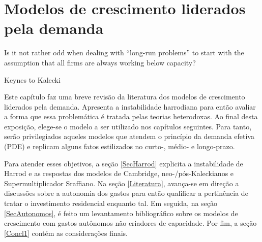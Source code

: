 \chapter{Modelos de crescimento liderados pela demanda}
\label{CapTeorico}

\epigraph{Is it not rather odd when dealing with ``long-run problems'' to start with the assumption that all firms are always working below capacity?}{Keynes to Kalecki}


Este capítulo faz uma breve revisão da literatura dos modelos de crescimento liderados pela demanda. Apresenta a instabilidade harrodiana para então avaliar a forma que essa problemática é tratada pelas teorias heterodoxas.
Ao final desta exposição,  elege-se o modelo a ser utilizado nos capítulos seguintes.
Para tanto, serão privilegiados aqueles modelos que atendem o princípio da demanda efetiva (PDE)  e replicam alguns fatos estilizados no curto-, médio- e longo-prazo.

\begin{comment}
mais especificamente:
\begin{itemize}
	\item \textbf{Curto-prazo:} Determinação da poupança pelo investimento \cite{keynes_general_1936};
	\item \textbf{Médio-prazo:} Relação positiva entre taxa de investimento e crescimento \cite{cesaratto_neo-kaleckian_2015};
	\item \textbf{Longo-prazo:} Convergência ao grau de utilização ao normal\footnote{Por grau de utilização normal, adota-se a definição de \textcites[p.~423--4, Original de 1986]{ciccone_2017}: ``\textit{The `normal' utilization of capacity can therefore imply not only the expectation of a certain breadth and frequency of the fluctuations in demand, but also the expectation of the idleness of the excess capacity deliberately chosen by the entrepreneurs;}'' } \cites{ciccone_2017}{vianello_pace_1985}.
\end{itemize}
\end{comment}


Para atender esses objetivos, a seção \ref{SecHarrod} explicita a instabilidade de Harrod e as respostas dos modelos de Cambridge, neo-/pós-Kaleckianos e Supermultiplicador Sraffiano. 
Na seção \ref{Literatura}, avança-se em direção a discussões sobre a autonomia dos gastos para então qualificar a pertinência de tratar o investimento residencial enquanto tal.
Em seguida, na seção \ref{SecAutonomos}, é feito um levantamento bibliográfico sobre os modelos de crescimento com gastos autônomos não criadores de capacidade. 
Por fim, a seção \ref{Concl1} contém as considerações finais.






